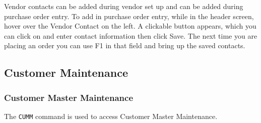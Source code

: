Vendor contacts can be added during vendor set up and can be added during purchase order entry. To add in purchase order entry, while in the header screen, hover over the Vendor Contact on the left. A clickable button appears, which you can click on and enter contact information then click Save. The next time you are placing an order you can use F1 in that field and bring up the saved contacts.

\subsection{Customer Maintenance}

\subsubsection{Customer Master Maintenance}


The \texttt{CUMM} command is used to access Customer Master Maintenance.

